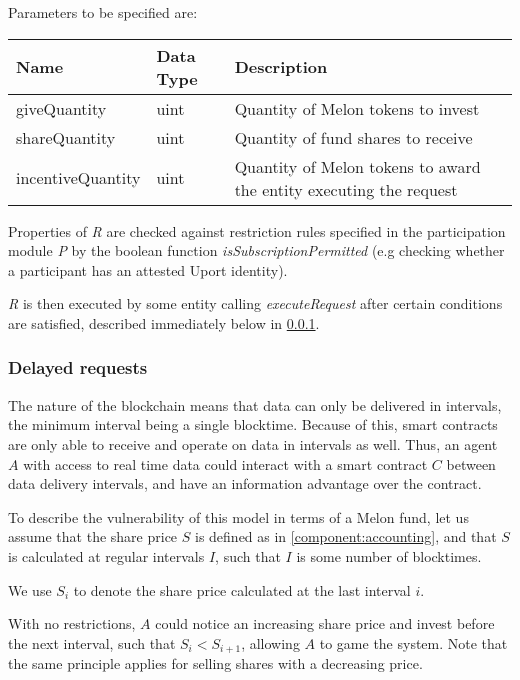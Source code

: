 \documentclass[conference]{IEEEtran}
\begin{document}
Parameters to be specified are:

\begin{center}
		\footnotesize
		\begin{tabular}{ | p{2.7cm} | p{1.2cm} | p{4cm} | }
		\hline
		Name & Data Type & Description \\ \hline
		giveQuantity & uint & Quantity of Melon tokens to invest \\ \hline
		shareQuantity & uint & Quantity of fund shares to receive \\ \hline
		incentiveQuantity & uint & Quantity of Melon tokens to award the entity executing the request \\ \hline
	\end{tabular}
\end{center}

Properties of \textit{R} are checked against restriction rules specified in the participation module \textit{P} by the boolean function \textit{isSubscriptionPermitted} (e.g checking whether a participant has an attested Uport identity).

\textit{R} is then executed by some entity calling \textit{executeRequest} after certain conditions are satisfied, described immediately below in \ref{delayed-requests}.

\subsubsection{Delayed requests} \label{delayed-requests}

The nature of the blockchain means that data can only be delivered in intervals, the minimum interval being a single blocktime.
Because of this, smart contracts are only able to receive and operate on data in intervals as well.
Thus, an agent $A$ with access to real time data could interact with a smart contract $C$ between data delivery intervals, and have an information advantage over the contract.

To describe the vulnerability of this model in terms of a Melon fund, let us assume that the share price $S$ is defined as in \ref{component:accounting}, and that $S$ is calculated at regular intervals $I$, such that $I$ is some number of blocktimes.

We use $S_i$ to denote the share price calculated at the last interval $i$.

With no restrictions, $A$ could notice an increasing share price and invest before the next interval, such that $S_i < S_{i+1}$, allowing $A$ to game the system.
Note that the same principle applies for selling shares with a decreasing price.
\end{document}
